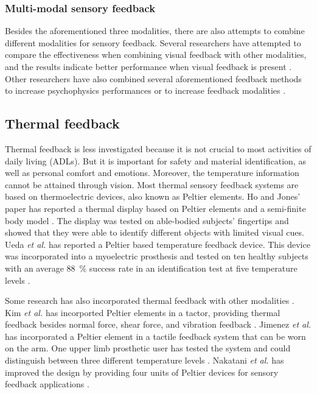 \subsubsection{Multi-modal sensory feedback}
Besides the aforementioned three modalities, there are also attempts to combine different modalities for sensory feedback. 
Several researchers have attempted to compare the effectiveness when combining visual feedback with other modalities, and the results indicate better performance when visual feedback is present \cite{saunders2011role, patterson1992design}. Other researchers have also combined several aforementioned feedback methods to increase psychophysics performances \cite{d2014hyve, huang2017multi} or to increase feedback modalities \cite{jimenez2014evaluation}.


\subsection{Thermal feedback}

Thermal feedback is less investigated because it is not crucial to most activities of daily living (ADLs). But it is important for safety and material identification, as well as personal comfort and emotions. Moreover, the temperature information cannot be attained through vision. Most thermal sensory feedback systems are based on thermoelectric devices, also known as Peltier elements. 
Ho and Jones' paper has reported a thermal display based on Peltier elements and a semi-finite body model \cite{ho2007development}. The display was tested on able-bodied subjects' fingertips and showed that they were able to identify different objects with limited visual cues.
Ueda \textit{et al.} has reported a Peltier based temperature feedback device. This device was incorporated into a myoelectric prosthesis and tested on ten healthy subjects with an average \SI{88}{\%} success rate in an identification test at five temperature levels  \cite{ueda2016development}.

Some research has also incorporated thermal feedback with other modalities \cite{nakatani2016novel, kim2008design}.
Kim \textit{et al.} has incorported Peltier elements in a tactor, providing thermal feedback besides normal force, shear force, and vibration feedback \cite{kim2008design}. 
Jimenez \textit{et al.} has incorporated a Peltier element in a tactile feedback system that can be worn on the arm. One upper limb prosthetic user has tested the system and could distinguish between three different temperature levels \cite{jimenez2014evaluation}. Nakatani \textit{et al.} has improved the design by providing four units of Peltier devices for sensory feedback applications \cite{nakatani2016novel}.


